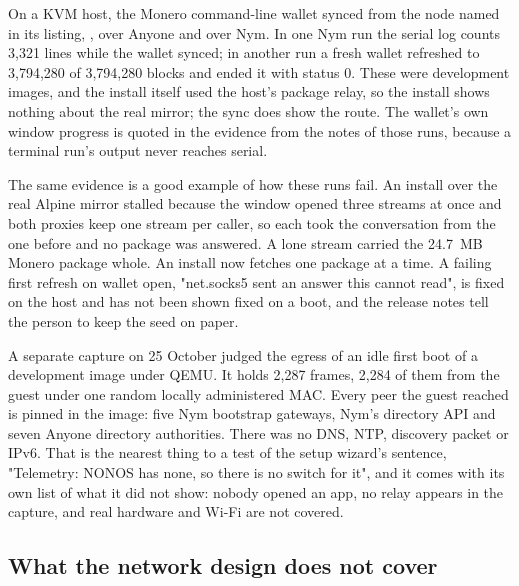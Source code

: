On a KVM host, the Monero command-line wallet synced from the node named in its listing, , over Anyone and over Nym. In one Nym run the serial log counts 3,321  lines while the wallet synced; in another run a fresh wallet refreshed to 3,794,280 of 3,794,280 blocks and  ended it with status 0. These were development images, and the install itself used the host's package relay, so the install shows nothing about the real mirror; the sync does show the route. The wallet's own window progress is quoted in the evidence from the notes of those runs, because a terminal run's output never reaches serial.

The same evidence is a good example of how these runs fail. An install over the real Alpine mirror stalled because the window opened three streams at once and both proxies keep one stream per caller, so each took the conversation from the one before and no package was answered. A lone stream carried the 24.7~MB Monero package whole. An install now fetches one package at a time. A failing first refresh on wallet open, "net.socks5 sent an answer this cannot read", is fixed on the host and has not been shown fixed on a boot, and the release notes tell the person to keep the seed on paper.

A separate capture on 25 October judged the egress of an idle first boot of a development image under QEMU. It holds 2,287 frames, 2,284 of them from the guest under one random locally administered MAC. Every peer the guest reached is pinned in the image: five Nym bootstrap gateways, Nym's directory API and seven Anyone directory authorities. There was no DNS, NTP, discovery packet or IPv6. That is the nearest thing to a test of the setup wizard's sentence, "Telemetry: NONOS has none, so there is no switch for it", and it comes with its own list of what it did not show: nobody opened an app, no relay appears in the capture, and real hardware and Wi-Fi are not covered.

\subsection{What the network design does not cover}

